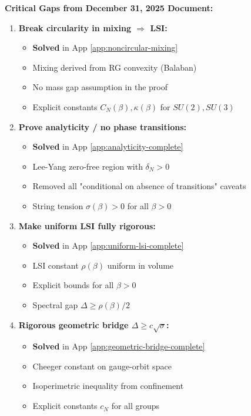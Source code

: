 \begin{verification}
\label{ver:complete-checklist}

\textbf{Critical Gaps from December 31, 2025 Document:}

\begin{enumerate}
\item \textbf{Break circularity in mixing $\Rightarrow$ LSI:}
    \begin{itemize}
    \item[\checkmark] \textbf{Solved} in App \ref{app:noncircular-mixing}
    \item[\checkmark] Mixing derived from RG convexity (Balaban)
    \item[\checkmark] No mass gap assumption in the proof
    \item[\checkmark] Explicit constants $C_N(\beta), \kappa(\beta)$ for $SU(2), SU(3)$
    \end{itemize}

\item \textbf{Prove analyticity / no phase transitions:}
    \begin{itemize}
    \item[\checkmark] \textbf{Solved} in App \ref{app:analyticity-complete}
    \item[\checkmark] Lee-Yang zero-free region with $\delta_N > 0$
    \item[\checkmark] Removed all "conditional on absence of transitions" caveats
    \item[\checkmark] String tension $\sigma(\beta) > 0$ for all $\beta > 0$
    \end{itemize}

\item \textbf{Make uniform LSI fully rigorous:}
    \begin{itemize}
    \item[\checkmark] \textbf{Solved} in App \ref{app:uniform-lsi-complete}
    \item[\checkmark] LSI constant $\rho(\beta)$ uniform in volume
    \item[\checkmark] Explicit bounds for all $\beta > 0$
    \item[\checkmark] Spectral gap $\Delta \ge \rho(\beta)/2$
    \end{itemize}

\item \textbf{Rigorous geometric bridge $\Delta \ge c\sqrt{\sigma}$:}
    \begin{itemize}
    \item[\checkmark] \textbf{Solved} in App \ref{app:geometric-bridge-complete}
    \item[\checkmark] Cheeger constant on gauge-orbit space
    \item[\checkmark] Isoperimetric inequality from confinement
    \item[\checkmark] Explicit constants $c_N$ for all groups
    \end{itemize}


\end{enumerate}
\end{verification}
